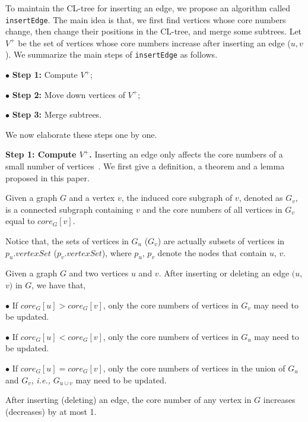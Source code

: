 To maintain the CL-tree for inserting an edge, we propose an algorithm called {\tt insertEdge}.
The main idea is that, we first find vertices whose core numbers change, then change their positions in the CL-tree, and merge some subtrees. Let $V^+$ be the set of vertices whose core numbers increase after inserting an edge ($u,v$).
We summarize the main steps of {\tt insertEdge} as follows.

$\bullet$ \textbf{Step 1:} Compute $V^+$;

$\bullet$ \textbf{Step 2:} Move down vertices of $V^+$;

$\bullet$ \textbf{Step 3:} Merge subtrees.

We now elaborate these steps one by one.

\textbf{Step 1: Compute $V^+$.}
Inserting an edge only affects the core numbers of a small number of vertices~\cite{kcoreUpdate,sariyuce2016incremental}. We first give a definition, a theorem and a lemma proposed in this paper.

\begin{definition}
\label{df:inducedgraph}
Given a graph $G$ and a vertex $v$, the induced core subgraph of $v$, denoted as $G_v$, is a connected subgraph containing $v$ and the core numbers of all vertices in $G_v$ equal to $core_{G}[v]$.
\end{definition}

Notice that, the sets of vertices in $G_u$ ($G_v$) are actually subsets of vertices in $p_u.vertexSet$ ($p_v.vertexSet$),
where $p_u$, $p_v$ denote the nodes that contain $u$, $v$.

\begin{theorem}
\label{thrm:kcoreupdate}
Given a graph $G$ and two vertices $u$ and $v$. After inserting or deleting an edge $(u$,$v)$ in $G$, we have that,

$\bullet$ If $core_G[u] > core_G[v]$, only the core numbers of vertices in $G_v$ may need to be updated.

$\bullet$ If $core_G[u] < core_G[v]$, only the core numbers of vertices in $G_u$ may need to be updated.

$\bullet$ If $core_G[u] = core_G[v]$, only the core numbers of vertices in the union of $G_u$ and $G_v$, \textit{i.e.,} $G_{u\cup v}$ may need to be updated.
\end{theorem}

\begin{lemma}
\label{lm:kcorelemma}
After inserting (deleting) an edge, the core number of any vertex in $G$ increases (decreases) by at most 1.
\end{lemma}


